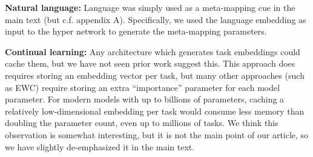 \documentclass{article}
\begin{document}
\textbf{Natural language:} Language was simply used as a meta-mapping cue in the main text (but c.f. appendix A). Specifically, we used the language embedding as input to the hyper network to generate the meta-mapping parameters. \par
{}
\textbf{Continual learning:} Any architecture which generates task embeddings could cache them, but we have not seen prior work suggest this. This approach does requires storing an embedding vector per task, but many other approaches (such as EWC) require storing an extra ``importance'' parameter for each model parameter. For modern models with up to billions of parameters, caching a relatively low-dimensional embedding per task would consume less memory than doubling the parameter count, even up to millions of tasks. We think this observation is somewhat interesting, but it is not the main point of our article, so we have slightly de-emphasized it in the main text. \par
\end{document}
